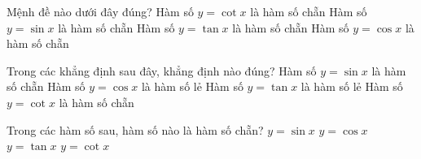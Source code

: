 

\begin{ex}%
	Mệnh đề nào dưới  đây đúng?
	 \choice
		{Hàm số  $y=\cot x$ là hàm số chẵn}
		{Hàm số $y=\sin x$ là hàm số chẵn} 
		{Hàm số $y=\tan x$ là hàm  số chẵn}
		{\True Hàm số  $y=\cos x$ là hàm số chẵn}
\end{ex}

\begin{ex}%
	Trong các khẳng định sau đây, khẳng định nào đúng? 
	 \choice
		{Hàm  số $y=\sin x$ là hàm số chẵn}
		{Hàm số $y=\cos x$ là hàm số lẻ} 
		{\True Hàm số $y=\tan x$  là hàm số lẻ}
		{Hàm số $y=\cot  x$ là hàm số chẵn}
\end{ex}

\begin{ex}%
	Trong các hàm số sau, hàm  số nào là hàm số chẵn?
	 \choice
		{$y=\sin  x$}
		{\True $y=\cos  x$}
		{$y=\tan x$} 
		{$y=\cot  x$}
\end{ex}

